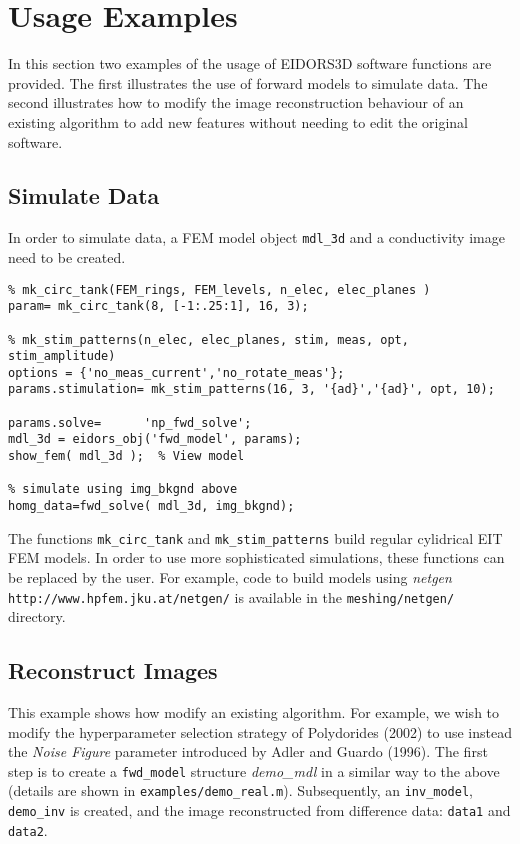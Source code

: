 \documentclass[12pt]{iopart}
\begin{document}
\section{ Usage Examples}

In this section two examples of the usage of EIDORS3D
software functions are provided. The first illustrates
the use of forward models to simulate data. The second
illustrates how to modify the image reconstruction
behaviour of an existing algorithm to
add new features without needing to edit the original
software.

\subsection{ Simulate Data }
In order to simulate data, a FEM model object {\tt mdl\_3d}
and a conductivity image need to be created.
\begin{verbatim}
% mk_circ_tank(FEM_rings, FEM_levels, n_elec, elec_planes )
param= mk_circ_tank(8, [-1:.25:1], 16, 3);

% mk_stim_patterns(n_elec, elec_planes, stim, meas, opt, stim_amplitude)
options = {'no_meas_current','no_rotate_meas'};
params.stimulation= mk_stim_patterns(16, 3, '{ad}','{ad}', opt, 10);

params.solve=      'np_fwd_solve';
mdl_3d = eidors_obj('fwd_model', params);
show_fem( mdl_3d );  % View model

% simulate using img_bkgnd above
homg_data=fwd_solve( mdl_3d, img_bkgnd);
\end{verbatim}

The functions {\tt mk\_circ\_tank} and {\tt mk\_stim\_patterns}
build regular cylidrical EIT FEM models. In order to use more
sophisticated simulations, these functions can be replaced
by the user. For example, code to build models using {\em netgen}
{\tt http://www.hpfem.jku.at/netgen/} is available in the
{\tt meshing/netgen/} directory.

\subsection{  Reconstruct Images }

This example shows how modify an existing algorithm.
For example, we wish to modify the
hyperparameter selection strategy of Polydorides (2002) to use
instead the {\em Noise Figure} parameter introduced by
Adler and Guardo (1996). The first step is to create a
{\tt fwd\_model} structure {\em demo\_mdl} in a similar
way to the above (details are shown in {\tt examples/demo\_real.m}).
Subsequently, an {\tt inv\_model}, {\tt demo\_inv} is created,
and the image reconstructed from difference data: 
{\tt data1} and {\tt data2}.
\end{document}
